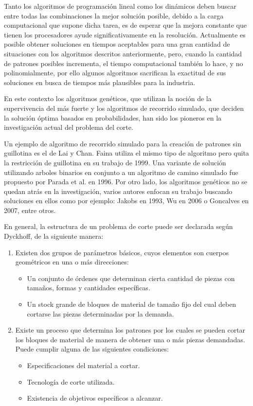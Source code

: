 \documentclass[journal, 10pt]{IEEEtran}
\begin{document}
	Tanto los algoritmos de programación lineal como los dinámicos deben buscar
	entre todas las combinaciones la mejor solución posible, debido a la carga
	computacional que supone dicha tarea, es de esperar que la mejora constante
	que tienen los procesadores ayude significativamente en la resolución. 
	Actualmente es posible obtener soluciones en tiempos aceptables para una 
	gran cantidad de situaciones con los algoritmos descritos anteriormente,
	pero, cuando la cantidad de patrones posibles incrementa, el tiempo 
	computacional también lo hace, y no polinomialmente, por ello algunos
	algoritmos sacrifican la exactitud de sus soluciones en busca de tiempos
	más plausibles para la industria.
	
	En este contexto los algoritmos genéticos\cite{Holland:1975}, que utilizan
	la noción de la supervivencia del más fuerte y los algoritmos de recorrido
	simulado\cite{Kirk:1983}\cite{Cerny:1985}, que deciden la solución óptima 
	basados en probabilidades, han sido los pioneros en la investigación actual
	del problema del corte. 
	
	Un ejemplo de algoritmo de recorrido simulado para la creación de patrones
	sin guillotina es el de Lai y Chan\cite{Lai:1997}. Faina utiliza el mismo
	tipo de algoritmo pero quita la restricción de guillotina en su trabajo de
	1999\cite{Faina:1999}. Una variante de solución utilizando arboles
	binarios en conjunto a un algoritmo de camino simulado fue propuesto por 
	Parada et al. en 1996\cite{Parada:1996}. Por otro lado, los algoritmos 
	genéticos no se quedan atrás en la investigación, varios autores enfocan
	su trabajo buscando soluciones en ellos como por ejemplo: Jakobs en 
	1993\cite{Jackobs:1993}, Wu en 2006\cite{Wu:2006} o Goncalves en 
	2007\cite{Gon:2007}, entre otros.
	
	En general, la estructura de un problema de corte puede ser declarada según
	Dyckhoff\cite{Dyckhoff:1990}, de la siguiente manera:
	\begin{enumerate}
		\item Existen dos grupos de parámetros básicos, cuyos elementos son
		cuerpos geométricos en una o más direcciones:
		\begin{itemize}
			\item Un conjunto de órdenes que determinan cierta cantidad de 
			piezas con tamaños, formas y cantidades específicas.
			\item Un stock grande de bloques de material de tamaño fijo del 
			cual deben cortarse las piezas determinadas por la demanda.
		\end{itemize}
		\item Existe un proceso que determina los patrones por los cuales se 
		pueden cortar los bloques de material de manera de obtener una o más
		piezas demandadas. Puede cumplir alguna de las siguientes condiciones:
		\begin{itemize}
			\item Especificaciones del material a cortar.
			\item Tecnología de corte utilizada.
			\item Existencia de objetivos específicos a alcanzar.
		\end{itemize}
	\end{enumerate}
\end{document}
